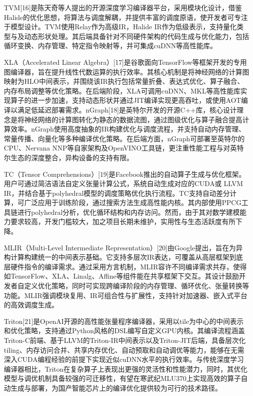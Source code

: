 \documentclass[a4paper, nosysfonts]{hpcchina}
\begin{document}
TVM[16]是陈天奇等人提出的开源深度学习编译器平台，采用模块化设计，借鉴Halide的优化思想，将算法与调度解耦，并提供丰富的调度原语，使开发者可专注于模型设计。TVM使用Relay作为高级IR，Halide IR作为低级表示，支持量化类型与及动态形状处理。其后端具备针对不同硬件架构的代码生成与优化能力，包括循环变换、内存管理、特定指令映射等，并可集成cuDNN等高性能库。

XLA（Accelerated Linear Algebra）[17]是谷歌面向TensorFlow等框架开发的专用图编译器，旨在提升线性代数运算的执行效率。其核心机制是将神经网络的计算图映射为HLO中间表示，并围绕该IR执行包括常量折叠、表达式优化、算子融合、内存布局调整等优化策略。在后端阶段，XLA可调用cuDNN、MKL等高性能库实现算子的进一步加速，支持动态形状并通过JIT编译实现更高吞吐，或使用AOT编译以满足低延迟部署需求。nGraph[18]是英特尔开发的开源C++库，核心设计理念是将神经网络的计算图转化为静态的数据流图，通过图级优化与算子融合提高计算效率。nGraph使用高度抽象的IR构建优化与调度流程，并支持自动内存管理、常量传播、向量化等多种编译优化策略。在后端方面，nGraph可部署至英特尔的CPU、Nervana NNP等自家架构及OpenVINO工具链，更注重性能工程与对英特尔生态的深度整合，异构设备的支持有限。

TC（Tensor Comprehensions）[19]是Facebook推出的自动算子生成与优化框架。用户可通过简洁语法自定义张量计算公式，系统自动生成对应的CUDA或 LLVM IR，并结合基于polyhedral模型的调度策略优化执行流程。TC支持自动差分计算，可广泛应用于训练阶段，通过搜索方法生成高性能内核。其内部使用PPCG工具链进行polyhedral分析，优化循环结构和内存访问。然而，由于其对数学建模能力要求较高，开发门槛较大，加之项目长期未维护，实用性与生态活跃度有所下降。

MLIR（Multi-Level Intermediate Representation）[20]由Google提出，旨在为异构计算构建统一的中间表示基础。它支持多层次IR表达，可覆盖从高层框架到底层硬件指令的编译需求。通过采用方言机制，MLIR容许不同编译需求共存，使得如TensorFlow、XLA、Linalg、Affine等组件能在共享框架下交互。其设计鼓励开发者自定义优化策略，同时可实现跨编译阶段的内存管理、循环优化、张量转换等功能。MLIR强调模块复用、IR可组合性与扩展性，支持针对加速器、嵌入式平台的高效调度生成。

Triton[21]是OpenAI开源的高性能张量程序编译器，采用以tile为中心的中间表示和优化策略，支持通过Python风格的DSL编写自定义GPU内核。其编译流程涵盖Triton-C前端、基于LLVM的Triton-IR中间表示以及Triton-JIT后端，具备层次化tiling、内存访问合并、共享内存优化、自动预取和自动调优等能力，能够在无需深入CUDA编程经验的前提下实现近似cuDNN水平的执行效率。与传统深度学习编译器相比，Triton在复杂算子上表现出更强的灵活性和性能潜力，同时，其优化模型与调优机制具备较强的可迁移性，有望在寒武纪MLU370上实现高效的算子自动生成与部署，为国产智能芯片上的编译优化提供较为可行的技术路径。
\end{document}

